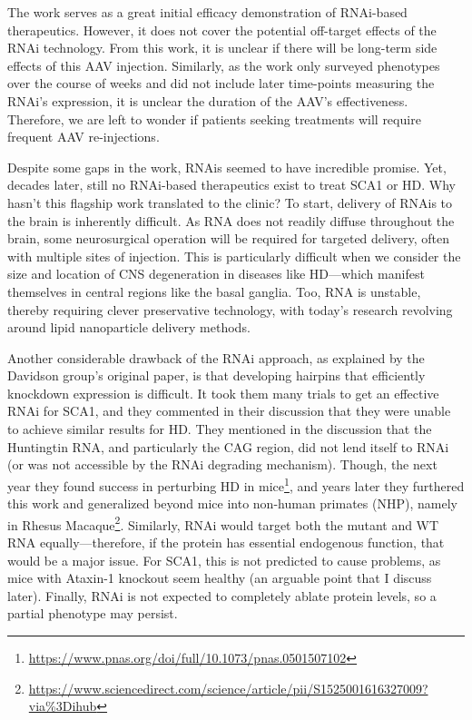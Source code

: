 The work serves as a great initial efficacy demonstration of RNAi-based therapeutics. However, it does not cover the potential off-target effects of the RNAi technology. From this work, it is unclear if there will be long-term side effects of this AAV injection. Similarly, as the work only surveyed phenotypes over the course of weeks and did not include later time-points measuring the RNAi's expression, it is unclear the duration of the AAV's effectiveness. Therefore, we are left to wonder if patients seeking treatments will require frequent AAV re-injections.\newline

Despite some gaps in the work, RNAis seemed to have incredible promise. Yet, decades later, still no RNAi-based therapeutics exist to treat SCA1 or HD. Why hasn't this flagship work translated to the clinic? To start, delivery of RNAis to the brain is inherently difficult. As RNA does not readily diffuse throughout the brain, some neurosurgical operation will be required for targeted delivery, often with multiple sites of injection. This is particularly difficult when we consider the size and location of CNS degeneration in diseases like HD---which manifest themselves in central regions like the basal ganglia. Too, RNA is unstable, thereby requiring clever preservative technology, with today's research revolving around lipid nanoparticle delivery methods.\newline

Another considerable drawback of the RNAi approach, as explained by the Davidson group's original paper, is that developing hairpins that efficiently knockdown expression is difficult. It took them many trials to get an effective RNAi for SCA1, and they commented in their discussion that they were unable to achieve similar results for HD. They mentioned in the discussion that the Huntingtin RNA, and particularly the CAG region, did not lend itself to RNAi (or was not accessible by the RNAi degrading mechanism). Though, the next year they found success in perturbing HD in mice\footnote{\url{https://www.pnas.org/doi/full/10.1073/pnas.0501507102}}, and years later they furthered this work and generalized beyond mice into non-human primates (NHP), namely in Rhesus Macaque\footnote{\url{https://www.sciencedirect.com/science/article/pii/S1525001616327009?via\%3Dihub}}. Similarly, RNAi would target both the mutant and WT RNA equally---therefore, if the protein has essential endogenous function, that would be a major issue. For SCA1, this is not predicted to cause problems, as mice with Ataxin-1 knockout seem healthy (an arguable point that I discuss later). Finally, RNAi is not expected to completely ablate protein levels, so a partial phenotype may persist.\newline


